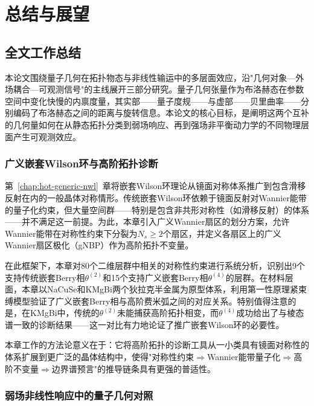 
\chapter{总结与展望}

\section{全文工作总结}

本论文围绕量子几何在拓扑物态与非线性输运中的多层面效应，沿"几何对象—外场耦合—可观测信号"的主线展开三部分研究。量子几何张量作为布洛赫态在参数空间中变化快慢的内禀度量，其实部——量子度规——与虚部——贝里曲率——分别编码了布洛赫态之间的距离与旋转信息。本论文的核心目标，是阐明这两个互补的几何量如何在从静态拓扑分类到弱场响应、再到强场非平衡动力学的不同物理层面产生可观测效应。

\subsection{广义嵌套Wilson环与高阶拓扑诊断}

第~\ref{chap:hot-generic-nwl}~章将嵌套Wilson环理论从镜面对称体系推广到包含滑移反射在内的一般晶体对称情形。传统嵌套Wilson环依赖于镜面反射对Wannier能带的量子化约束，但大量空间群——特别是包含非共形对称性（如滑移反射）的体系——并不满足这一前提。为此，本章引入广义Wannier扇区的划分方案，允许Wannier能带在对称性约束下分裂为$N_s \ge 2$个扇区，并定义各扇区上的广义Wannier扇区极化（gNBP）作为高阶拓扑不变量。

在此框架下，本章对80个二维层群中相关的对称性约束进行系统分析，识别出9个支持传统嵌套Berry相$\theta^{(2)}$和15个支持广义嵌套Berry相$\theta^{(4)}$的层群。在材料层面，本章以NaCuSe和KMgBi两个狄拉克半金属为原型体系，利用第一性原理紧束缚模型验证了广义嵌套Berry相与高阶费米弧之间的对应关系。特别值得注意的是，在KMgBi中，传统的$\theta^{(2)}$未能捕获高阶拓扑相变，而$\theta^{(4)}$成功给出了与棱态谱一致的诊断结果——这一对比有力地论证了推广嵌套Wilson环的必要性。

本章工作的方法论意义在于：它将高阶拓扑的诊断工具从一小类具有镜面对称性的体系扩展到更广泛的晶体结构中，使得"对称性约束$\Rightarrow$Wannier能带量子化$\Rightarrow$高阶不变量$\Rightarrow$边界谱预言"的推导链条具有更强的普适性。

\subsection{弱场非线性响应中的量子几何对照}

